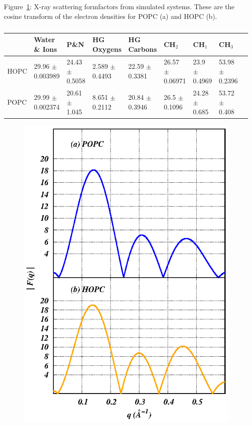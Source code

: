 \documentclass[12pt,preprint,times,openany,draft]{book}
\begin{document}
Figure~\ref{supp:formfactor}: X-ray scattering
formfactors from simulated systems. These are the cosine
transform of the electron densities for POPC (a) and HOPC (b).
~\\
\clearpage
\clearpage

\begin{table}
\caption{ }
\label{supp:tab:volumes}
{\footnotesize
\begin{tabularx}{\textwidth}{X|X|X|X|X|X|X|X|X}
&Water \& Ions & P\&N & HG Oxygens & HG Carbons & CH$_2$ & CH$_1$ & CH$_3$  \\\hline
HOPC&29.96 $\pm$ 0.003989 & 24.43 $\pm$ 0.5058 & 2.589 $\pm$ 0.4493 & 22.59 $\pm$ 0.3381 & 26.57 $\pm$ 0.06971 & 23.9 $\pm$ 0.4969 & 53.98 $\pm$ 0.2396 \\
POPC&29.99 $\pm$ 0.002374 & 20.61 $\pm$ 1.045 & 8.651 $\pm$ 0.2112 & 20.84 $\pm$ 0.3946 & 26.5 $\pm$ 0.1096 & 24.28 $\pm$ 0.685 & 53.72 $\pm$ 0.408 \\
\end{tabularx}
}
\end{table}

\clearpage

\begin{figure}
\caption{ }
\label{supp:formfactor}
\includegraphics[width=\textwidth]{formfactor.eps}
\end{figure}
\clearpage
\FloatBarrier
\end{document}
